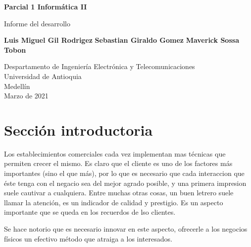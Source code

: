 \documentclass{article}
\begin{document}
\begin{titlepage}
    \begin{center}
        \vspace*{1cm}
            
        \Huge
        \textbf{Parcial 1 Informática II}
            
        \vspace{0.5cm}
        \LARGE
        Informe del desarrollo
            
        \vspace{1.5cm}
            
        \textbf{Luis Miguel Gil Rodrigez}
        \newline
        \textbf{Sebastian Giraldo Gomez}
        \newline
        \textbf{Maverick Sossa Tobon}
        \newline
            
        \vfill
            
        \vspace{0.8cm}
            
        \Large
        Despartamento de Ingeniería Electrónica y Telecomunicaciones\\
        Universidad de Antioquia\\
        Medellín\\
        Marzo de 2021
            
    \end{center}
\end{titlepage}

\tableofcontents
\newpage
\section{Sección introductoria}\label{intro}
Los establecimientos comerciales cada vez implementan mas técnicas que permiten crecer el mismo. Es claro que el cliente es uno de los factores más importantes (sino el que más), por lo que es necesario que cada interaccion que éste tenga con el negacio sea del mejor agrado posible, y una primera impresion suele cautivar a cualquiera. Entre muchas otras cosas, un buen letrero suele llamar la atención, es un indicador de calidad y prestigio. Es un aspecto importante que se queda en los recuerdos de lso clientes. 
\newline

Se hace notorio que es necesario innovar en este aspecto, ofrecerle a los negocios físicos un efectivo método que atraiga a los interesados.  
\end{document}
